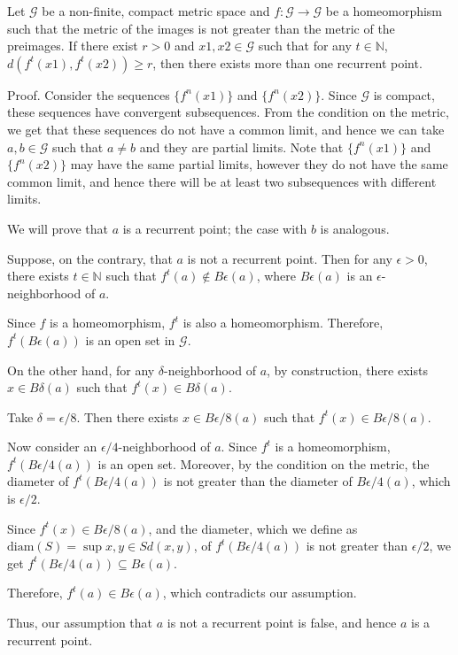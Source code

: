 \documentclass[a4paper,12pt]{article}
\begin{document}
Let $\mathcal{G}$ be a non-finite, compact metric space and $f: \mathcal{G} \to \mathcal{G}$ be a homeomorphism such that the metric of the images is not greater than the metric of the preimages. If there exist $r > 0$ and $x1, x2 \in \mathcal{G}$ such that for any $t \in \mathbb{N}$, $d(f^t(x1), f^t(x2)) \geq r$, then there exists more than one recurrent point.

Proof. Consider the sequences $\{ f^n(x1) \}$ and $\{ f^n(x2) \}$. Since $\mathcal{G}$ is compact, these sequences have convergent subsequences. From the condition on the metric, we get that these sequences do not have a common limit, and hence we can take $a, b \in \mathcal{G}$ such that $a \neq b$ and they are partial limits. Note that $\{ f^n(x1) \}$ and $\{ f^n(x2) \}$ may have the same partial limits, however they do not have the same common limit, and hence there will be at least two subsequences with different limits.

We will prove that $a$ is a recurrent point; the case with $b$ is analogous.

Suppose, on the contrary, that $a$ is not a recurrent point. Then for any $\epsilon > 0$, there exists $t \in \mathbb{N}$ such that $f^t(a) \notin B\epsilon(a)$, where $B\epsilon(a)$ is an $\epsilon$-neighborhood of $a$.

Since $f$ is a homeomorphism, $f^t$ is also a homeomorphism. Therefore, $f^t(B\epsilon(a))$ is an open set in $\mathcal{G}$.

On the other hand, for any $\delta$-neighborhood of $a$, by construction, there exists $x \in B\delta(a)$ such that $f^t(x) \in B\delta(a)$.

Take $\delta = \epsilon/8$. Then there exists $x \in B{\epsilon/8}(a)$ such that $f^t(x) \in B{\epsilon/8}(a)$.

Now consider an $\epsilon/4$-neighborhood of $a$. Since $f^t$ is a homeomorphism, $f^t(B{\epsilon/4}(a))$ is an open set. Moreover, by the condition on the metric, the diameter of $f^t(B{\epsilon/4}(a))$ is not greater than the diameter of $B{\epsilon/4}(a)$, which is $\epsilon/2$.

Since $f^t(x) \in B{\epsilon/8}(a)$, and the diameter, which we define as $\mathrm{diam}(S) = \sup{x, y \in S} d(x, y)$, of $f^t(B{\epsilon/4}(a))$ is not greater than $\epsilon/2$, we get $f^t(B{\epsilon/4}(a)) \subseteq B\epsilon(a)$.

Therefore, $f^t(a) \in B\epsilon(a)$, which contradicts our assumption.

Thus, our assumption that $a$ is not a recurrent point is false, and hence $a$ is a recurrent point.
\end{document}
